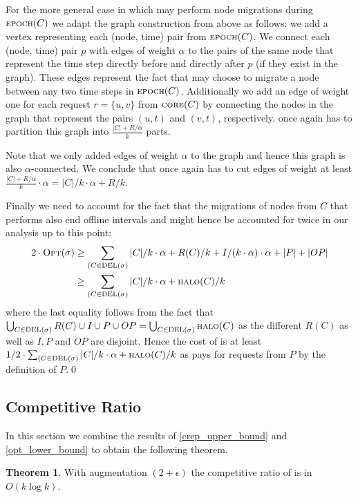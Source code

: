 \documentclass[a4paper,xcolor=dvipsnames, tikz, 12pt]{article}
\newcommand{\crep}{\text{C{\scriptsize REP}}}
\newcommand{\del}{\text{\scriptsize DEL}}
\newcommand{\opt}{\text{O{\scriptsize PT}}}
\newcommand{\core}{\text{\scriptsize CORE}}
\newcommand{\halo}{\text{\scriptsize HALO}}
\newcommand{\epoch}{\text{\scriptsize EPOCH}}
\theoremstyle{definition}
\newtheorem{theo}[defi]{Theorem}
\begin{document}
For the more general case in which \opt{} may perform node migrations during $\epoch(C)$ we adapt the graph construction from above as follows: we add a vertex representing each (node, time) pair from $\epoch(C)$.
We connect each (node, time) pair $p$ with edges of weight $\alpha$ to the pairs of the same node that represent the time step directly before and directly after $p$ (if they exist in the graph). These edges represent the fact that \opt{} may choose to migrate a node between any two time steps in $\epoch(C)$.
Additionally we add an edge of weight one for each request $r=\{u,v\}$ from $\core(C)$ by connecting the nodes in the graph that represent the pairs $(u,t)$ and $(v,t)$, respectively. \opt{} once again has to partition this graph into $\frac{|C|+R/\alpha}{k}$ parts.

Note that we only added edges of weight $\alpha$ to the graph and hence this graph is also $\alpha$-connected. We conclude that once again \opt{} has to cut edges of weight at least $\frac{|C|+R/\alpha}{k}\cdot\alpha=|C|/k\cdot\alpha+R/k$.

Finally we need to account for the fact that the migrations of nodes from $C$ that \opt{} performs also end offline intervals and might hence be accounted for twice in our analysis up to this point:
\begin{align*}
2\cdot\opt(\sigma)&\geq\sum_{(C\in\del{}(\sigma)}|C|/k\cdot\alpha+R(C)/k+I/(k\cdot\alpha)\cdot\alpha+|P|+|OP|\\
&\geq\sum_{(C\in\del{}(\sigma)}|C|/k\cdot\alpha+\halo(C)/k
\end{align*}
where the last equality follows from the fact that 
$\bigcup_{C\in\del(\sigma)}R(C)\cup I\cup P\cup OP=\bigcup_{C\in\del(\sigma)}\halo(C)$ as the different $R(C)$ as well as $I, P$ and $OP$ are disjoint.
Hence the cost of \opt{} is at least $1/2\cdot\sum_{(C\in\del{}(\sigma)}|C|/k\cdot\alpha+\halo(C)/k$ as \opt{} pays for requests from $P$ by the definition of $P$.\qed


\subsection{Competitive Ratio}
In this section we combine the results of \cref{crep_upper_bound} and \cref{opt_lower_bound} to obtain the following theorem.

\begin{theo}
	\label{comp_ratio_theo}
	With augmentation $(2+\epsilon)$ the competitive ratio of \crep{} is in $O(k \log k)$.
\end{theo}
\end{document}
